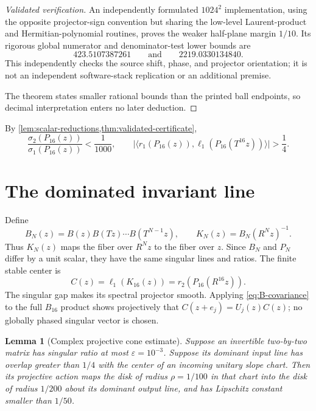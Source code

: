 \documentclass[11pt,reqno]{amsart}
\numberwithin{equation}{section}
\newtheorem{lemma}[theorem]{Lemma}
\theoremstyle{definition}
\newcommand{\ip}[2]{\langle #1,#2\rangle}
\newcommand{\abs}[1]{\lvert #1\rvert}
\begin{document}
\begin{proof}[Validated verification]
An independently formulated $1024^2$ implementation, using the opposite
projector-sign convention but sharing the low-level Laurent-product and
Hermitian-polynomial routines, proves the weaker half-plane margin $1/10$.
Its rigorous global numerator and denominator-test lower bounds are
\[
 423.5107387261\qquad\text{and}\qquad2219.0330134840.
\]
This independently checks the source shift, phase, and projector orientation;
it is not an independent software-stack replication or an additional premise.

The theorem states smaller rational bounds than the printed ball endpoints,
so decimal interpretation enters no later deduction.
\end{proof}

By \cref{lem:scalar-reductions,thm:validated-certificate},
\begin{equation}\label{eq:domination-and-junction}
 \frac{\sigma_2(P_{16}(z))}{\sigma_1(P_{16}(z))}<\frac1{1000},\qquad
 \abs{\ip{r_1(P_{16}(z))}{\ell_1(P_{16}(T^{16}z))}}>\frac14.
\end{equation}

\section{The dominated invariant line}
\label{sec:domination}

Define
\begin{equation}\label{eq:BN-KN}
 B_N(z)=B(z)B(Tz)\cdots B(T^{N-1}z),\qquad
 K_N(z)=B_N(R^N z)^{-1}.
\end{equation}
Thus $K_N(z)$ maps the fiber over $R^N z$ to the fiber over $z$.  Since
$B_N$ and $P_N$ differ by a unit scalar, they have the same singular lines
and ratios.  The finite stable center is
\[
 C(z)=\ell_1(K_{16}(z))=r_2(P_{16}(R^{16}z)).
\]
The singular gap makes its spectral projector smooth.  Applying
\eqref{eq:B-covariance} to the full $B_{16}$ product shows projectively that
$C(z+e_j)=U_j(z)C(z)$; no globally phased singular vector is chosen.

\begin{lemma}[Complex projective cone estimate]\label{lem:cone}
Suppose an invertible two-by-two matrix has singular ratio at most
$\varepsilon=10^{-3}$.  Suppose its dominant input line has overlap greater
than $1/4$ with the center of an incoming unitary slope chart.  Then its
projective action maps the disk of radius $\rho=1/100$ in that chart into the
disk of radius $1/200$ about its dominant output line, and has Lipschitz
constant smaller than $1/50$.
\end{lemma}
\end{document}
